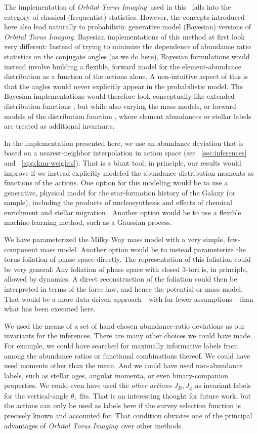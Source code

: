 \documentclass[modern]{aastex63}
\newcommand{\methodname}{\textsl{Orbital Torus Imaging}}
\begin{document}
The implementation of \methodname\ used in this \documentname\ falls into the
category of classical (frequentist) statistics.
However, the concepts introduced here also lead naturally to probabilistic
generative model (Bayesian) versions of \methodname.
Bayesian implementations of this method at first look very different:
Instead of trying to minimize the dependence of abundance ratio statistics on
the conjugate angles (as we do here), Bayesian formulations would instead
involve building a flexible, forward model for the element-abundance
distribution as a function of the actions alone.
A non-intuitive aspect of this is that the angles would never explicitly appear
in the probabilistic model.
The Bayesian implementations would therefore look conceptually like extended
distribution functions \citep{Sanders:2015}, but while also varying the mass
models, or forward models of the distribution function
\citep[e.g.,][]{Magorrian:2014}, where element abundances or stellar labels are
treated as additional invariants.

In the implementation presented here, we use an abundance deviation that is
based on a nearest-neighbor interpolation in action space (see
\sectionname~\ref{sec:inferences} and \appendixname~\ref{app:knn-weights}).
That is a blunt tool; in principle, our results would improve if we instead
explicitly modeled the abundance distribution moments as functions of the
actions.
One option for this modeling would be to use a generative, physical model for
the star-formation history of the Galaxy (or sample), including the products of
nucleosynthesis and effects of chemical enrichment and stellar migration
\citep[similar to what is done in][]{Sanders:2015}.
Another option would be to use a flexible machine-learning method, such as a
Gaussian process.

We have parameterized the Milky Way mass model with
a very simple, few-component mass model.
Another option would be to instead parameterize the torus foliation of phase
space directly.
The representation of this foliation could be very general: Any foliation of
phase space with closed 3-tori is, in principle, allowed by dynamics.
A direct reconstruction of the foliation could then be interpreted in terms of
the force law, and hence the potential or mass model.
That would be a more data-driven approach---with far fewer assumptions---than
what has been executed here.

We used the means of
a set of hand-chosen abundance-ratio deviations
as our invariants for the inferences.
There are many other choices we could have made.
For example, we could have searched for maximally informative labels from among
the abundance ratios or functional combinations thereof. We could have used
moments other than the mean. And we could have used non-abundance labels, such
as stellar ages, angular momenta, or even binary-companion properties.
We could even have used the \emph{other actions $J_R, J_\phi$}
as invariant labels for the vertical-angle $\theta_z$ fits.
That is an interesting thought for future work, but the actions can only be used
as labels here if the survey selection function is precisely known and accounted
for. That condition obviates one of the principal advantages of
\methodname\ over other methods.
\end{document}
